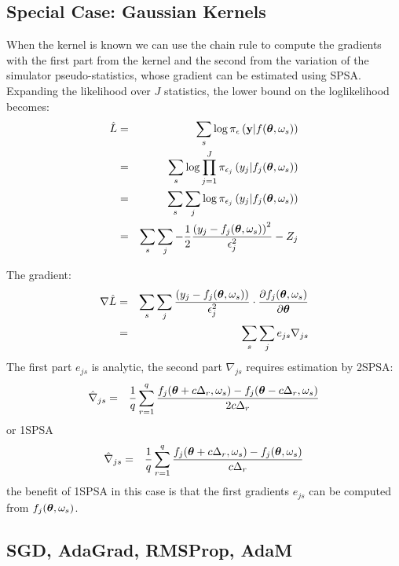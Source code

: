 \documentclass[]{article}
\begin{document}
\subsection{Special Case: Gaussian Kernels}
When the kernel is known we can use the chain rule to compute the gradients with the first part from the kernel and the second from the variation of the simulator pseudo-statistics, whose gradient can be estimated using SPSA.  Expanding the likelihood over $J$ statistics, the lower bound on the loglikelihood becomes:
\begin{eqnarray}
  \hat{L} & = & \sum_s \log \pi_{\epsilon}\left( {\bf y} | f({\bm \theta}, \omega_s)\right) \\
          & = & \sum_s \log \prod_{j=1}^J \pi_{\epsilon_j}\left( y_j | f_j({\bm \theta}, \omega_s)\right) \\
          & = & \sum_s \sum_j \log  \pi_{\epsilon_j}\left( y_j | f_j({\bm \theta}, \omega_s)\right) \\
          & = & \sum_s \sum_j -\frac{1}{2} \frac{\left( y_j - f_j({\bm \theta}, \omega_s)\right)^2}{\epsilon_j^2} - Z_j \\
\end{eqnarray}

The gradient:
\begin{eqnarray} 
  \nabla \hat{L} & = & \sum_s \sum_j \frac{\left( y_j - f_j({\bm \theta}, \omega_s)\right)}{\epsilon_j^2} \cdot \frac{\partial f_j({\bm \theta}, \omega_s)}{\partial {\bm \theta}} \\
                 & = & \sum_s \sum_j e_{js} \nabla_{js}
\end{eqnarray}
The first part $e_{js}$ is analytic, the second part $\nabla_{js}$ requires estimation by 2SPSA:
\begin{eqnarray} 
  \hat{ \nabla }_{js}  & = & \frac{1}{q} \sum_{r=1}^q \frac{f_j({\bm \theta} + c \Delta_r , \omega_s) - f_j({\bm \theta} - c \Delta_r , \omega_s)}{2 c \Delta_r}
\end{eqnarray}
or 1SPSA
\begin{eqnarray} 
  \hat{ \nabla }_{js} & = & \frac{1}{q} \sum_{r=1}^q \frac{f_j({\bm \theta} + c \Delta_r , \omega_s) - f_j({\bm \theta}, \omega_s)}{c \Delta_r}
\end{eqnarray}
the benefit of 1SPSA in this case is that the first gradients  $e_{js}$ can be computed from $f_j({\bm \theta}, \omega_s)$.

\subsection{SGD, AdaGrad, RMSProp, AdaM}
\end{document}
